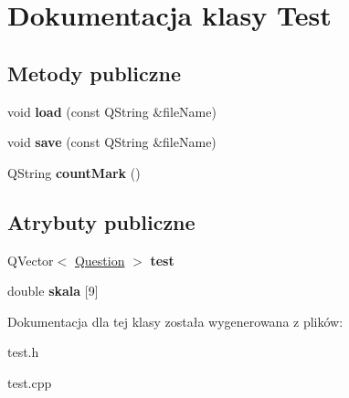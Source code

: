\hypertarget{classTest}{\section{\-Dokumentacja klasy \-Test}
\label{classTest}
}
\subsection*{\-Metody publiczne}
\begin{DoxyCompactItemize}
\item 
\hypertarget{classTest_a607ff8fba625b9a065d6f244848c0fb9}{void {\bfseries load} (const \-Q\-String \&file\-Name)}\label{classTest_a607ff8fba625b9a065d6f244848c0fb9}

\item 
\hypertarget{classTest_a6cbb43142b5a32d0cdfa69a40944dfec}{void {\bfseries save} (const \-Q\-String \&file\-Name)}\label{classTest_a6cbb43142b5a32d0cdfa69a40944dfec}

\item 
\hypertarget{classTest_a58ca352259ecd31858eac4c4dfb6d7bf}{\-Q\-String {\bfseries count\-Mark} ()}\label{classTest_a58ca352259ecd31858eac4c4dfb6d7bf}

\end{DoxyCompactItemize}
\subsection*{\-Atrybuty publiczne}
\begin{DoxyCompactItemize}
\item 
\hypertarget{classTest_ad0bd7c55b517abd81be08605e4bfccf4}{\-Q\-Vector$<$ \hyperlink{classQuestion}{\-Question} $>$ {\bfseries test}}\label{classTest_ad0bd7c55b517abd81be08605e4bfccf4}

\item 
\hypertarget{classTest_a8935bd9dbacdca1e260e09109802883f}{double {\bfseries skala} \mbox{[}9\mbox{]}}\label{classTest_a8935bd9dbacdca1e260e09109802883f}

\end{DoxyCompactItemize}


\-Dokumentacja dla tej klasy została wygenerowana z plików\-:\begin{DoxyCompactItemize}
\item 
test.\-h\item 
test.\-cpp\end{DoxyCompactItemize}
